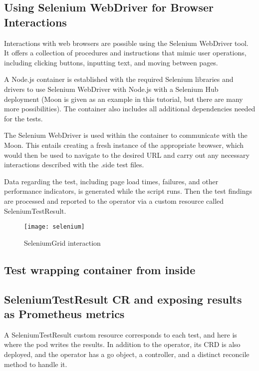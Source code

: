 \subsection{Using Selenium WebDriver for Browser Interactions}

Interactions with web browsers are possible using the Selenium WebDriver tool. It offers a collection of procedures and instructions that mimic user operations, including clicking buttons, inputting text, and moving between pages.

A Node.js container is established with the required Selenium libraries and drivers to use Selenium WebDriver with Node.js with a Selenium Hub deployment (Moon is given as an example in this tutorial, but there are many more possibilities). The container also includes all additional dependencies needed for the tests.

The Selenium WebDriver is used within the container to communicate with the Moon. This entails creating a fresh instance of the appropriate browser, which would then be used to navigate to the desired URL and carry out any necessary interactions described with the .side test files.

Data regarding the test, including page load times, failures, and other performance indicators, is generated while the script runs. Then the test findings are processed and reported to the operator via a custom resource called SeleniumTestResult.

\begin{figure}[H]
	\centering
	\texttt{[image: selenium]}
	\label{fig:selenium}
	\caption{SeleniumGrid interaction}
\end{figure}

\subsection{Test wrapping container from inside}



\subsection{SeleniumTestResult CR and exposing results as Prometheus metrics}

A SeleniumTestResult custom resource corresponds to each test, and here is where the pod writes the results. In addition to the operator, its CRD is also deployed, and the operator has a go object, a controller, and a distinct reconcile method to handle it.

